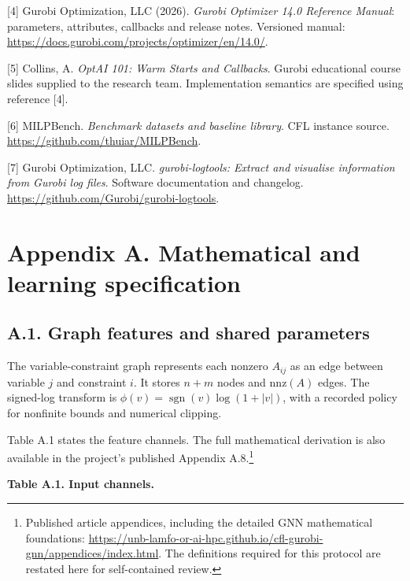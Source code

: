 \documentclass[
  british,
  10pt,
]{article}
\begin{document}
{[}4{]} Gurobi Optimization, LLC (2026). \emph{Gurobi Optimizer 14.0
Reference Manual}: parameters, attributes, callbacks and release notes.
Versioned manual:
\url{https://docs.gurobi.com/projects/optimizer/en/14.0/}.

{[}5{]} Collins, A. \emph{OptAI 101: Warm Starts and Callbacks}. Gurobi
educational course slides supplied to the research team. Implementation
semantics are specified using reference {[}4{]}.

{[}6{]} MILPBench. \emph{Benchmark datasets and baseline library}. CFL
instance source. \url{https://github.com/thuiar/MILPBench}.

{[}7{]} Gurobi Optimization, LLC. \emph{gurobi-logtools: Extract and
visualise information from Gurobi log files}. Software documentation and
changelog. \url{https://github.com/Gurobi/gurobi-logtools}.

\section{Appendix A. Mathematical and learning
specification}\label{appendix-a.-mathematical-and-learning-specification}

\subsection{A.1. Graph features and shared
parameters}\label{a.1.-graph-features-and-shared-parameters}

The variable-constraint graph represents each nonzero \(A_{ij}\) as an
edge between variable \(j\) and constraint \(i\). It stores \(n+m\)
nodes and \(\mathrm{nnz}(A)\) edges. The signed-log transform is
\(\phi(v)=\operatorname{sgn}(v)\log(1+|v|)\), with a recorded policy for
nonfinite bounds and numerical clipping.

Table A.1 states the feature channels. The full mathematical derivation
is also available in the project's published Appendix A.8.\footnote{Published
  article appendices, including the detailed GNN mathematical
  foundations:
  \url{https://unb-lamfo-or-ai-hpc.github.io/cfl-gurobi-gnn/appendices/index.html}.
  The definitions required for this protocol are restated here for
  self-contained review.}


\textbf{Table A.1. Input channels.}
\end{document}
